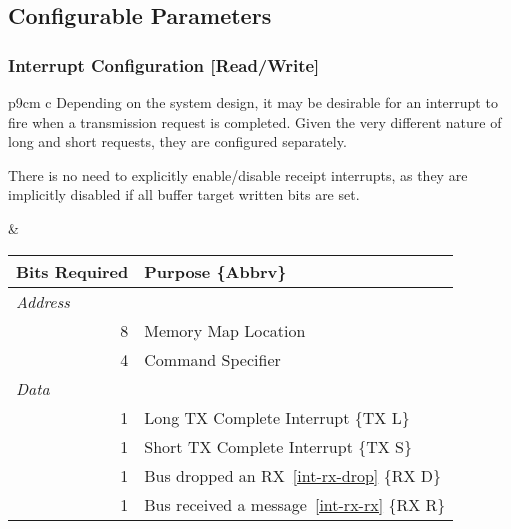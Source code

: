 \subsection{Configurable Parameters}

\subsubsection{Interrupt Configuration [Read/Write]}
\label{reg-conf}
\begin{tabular}{p{9cm} c}
\vspace{-5em}
Depending on the system design, it may be desirable for an interrupt to fire
when a transmission request is completed. Given the very different nature of
long and short requests, they are configured separately.

There is no need to explicitly enable/disable receipt interrupts, as they are
implicitly disabled if all buffer target written bits are set.

&

\begin{tabular}{r l}
  Bits Required & Purpose \{Abbrv\} \\
  \hline
  \hline
  \multicolumn{1}{l}{\em Address} & \\
  8 & \bus Memory Map Location \\
  4 & Command Specifier \\
  \multicolumn{1}{l}{\em Data} & \\
  1 & Long TX Complete Interrupt \{TX L\} \\
  1 & Short TX Complete Interrupt \{TX S\} \\
  1 & Bus dropped an RX~\ref{int-rx-drop} \{RX D\} \\
  1 & Bus received a message~\ref{int-rx-rx} \{RX R\} \\
\end{tabular}

\\

\end{tabular}

